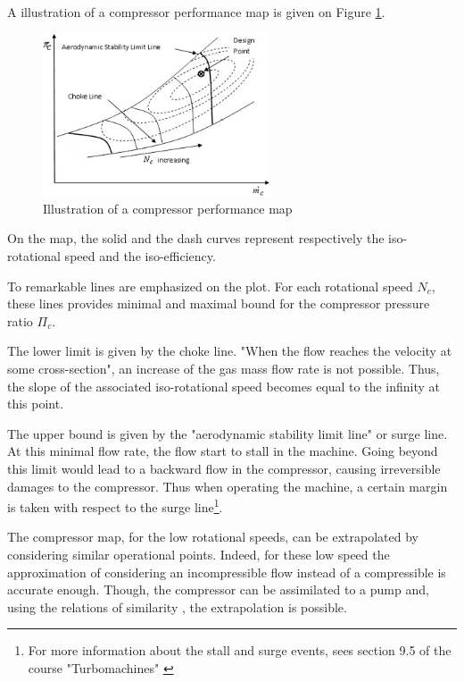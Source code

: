A illustration of a compressor performance map is given on Figure \ref{fig:C3_compmap}.
\begin{figure}[h]
\centering
\includegraphics[width=0.6\textwidth]{Comp_Map.png}
\caption{Illustration of a compressor performance map \citep{Ghorbanian2009}}
\label{fig:C3_compmap}
\end{figure}  

On the map, the solid and the dash curves represent respectively the iso-rotational speed and the iso-efficiency.

To remarkable lines are emphasized on the plot. For each rotational speed $N_c$, these lines provides minimal and maximal bound for the compressor pressure ratio $\Pi_c$. 

The lower limit is given by the choke line. "When the flow reaches the velocity at some cross-section"\citep{Ghorbanian2009}, an increase of the gas mass flow rate is not possible. Thus, the slope of the associated iso-rotational speed becomes equal to the infinity at this point. 

The upper bound is given by the "aerodynamic stability limit line" or surge line. At this minimal flow rate, the flow start to stall in the machine. Going beyond this limit would lead to a backward flow in the compressor, causing irreversible damages to the compressor. Thus when operating the machine, a certain margin is taken with respect to the surge line\footnote{For more information about the stall and surge events, sees section 9.5 of the course "Turbomachines" \citep{Hillewaert2019}}.

The compressor map, for the low rotational speeds, can be extrapolated by considering similar operational points. Indeed, for these low speed the approximation of considering an incompressible flow instead of a compressible is accurate enough. Though, the compressor can be assimilated to a pump and, using the relations of similarity \label{eq:C3_sim}, the extrapolation is possible. 

